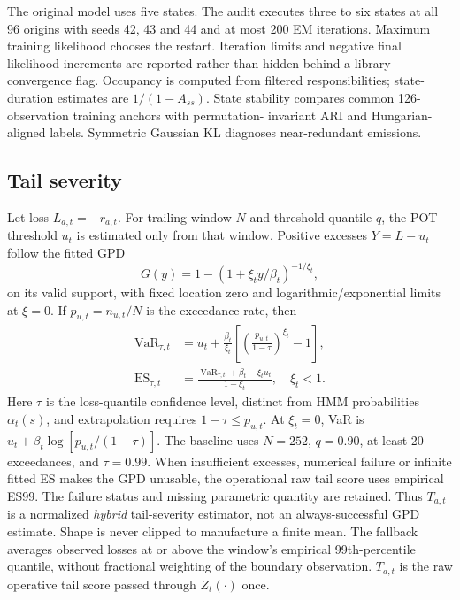 \documentclass[11pt]{article}
\begin{document}
The original model uses five states. The audit executes three to six states at all 96 origins with
seeds 42, 43 and 44 and at most 200 EM iterations. Maximum training likelihood chooses the restart.
Iteration limits and negative final likelihood increments are reported rather than hidden behind a
library convergence flag. Occupancy is computed from filtered responsibilities; state-duration estimates
are $1/(1-A_{ss})$. State stability compares common 126-observation training anchors with permutation-
invariant ARI and Hungarian-aligned labels. Symmetric Gaussian KL diagnoses near-redundant emissions.

\subsection{Tail severity}
Let loss $L_{a,t}=-r_{a,t}$. For trailing window $N$ and threshold quantile $q$, the POT threshold
$u_t$ is estimated only from that window. Positive excesses $Y=L-u_t$ follow the fitted GPD
\begin{equation}
G(y)=1-\left(1+\xi_t y/\beta_t\right)^{-1/\xi_t},
\end{equation}
on its valid support, with fixed location zero and logarithmic/exponential limits at $\xi=0$.
If $p_{u,t}=n_{u,t}/N$ is the exceedance rate, then
\begin{align}
\operatorname{VaR}_{\tau,t}
 &=u_t+\frac{\beta_t}{\xi_t}
 \left[\left(\frac{p_{u,t}}{1-\tau}\right)^{\xi_t}-1\right],\\
\operatorname{ES}_{\tau,t}
 &=\frac{\operatorname{VaR}_{\tau,t}+\beta_t-\xi_tu_t}{1-\xi_t},\quad \xi_t<1.
\end{align}
Here $\tau$ is the loss-quantile confidence level, distinct from HMM probabilities $\alpha_t(s)$,
and extrapolation requires $1-\tau\leq p_{u,t}$. At $\xi_t=0$, VaR is
$u_t+\beta_t\log[p_{u,t}/(1-\tau)]$. The baseline uses $N=252$, $q=0.90$,
at least 20 exceedances, and $\tau=0.99$.
When insufficient excesses, numerical failure or infinite fitted ES makes the GPD unusable,
the operational raw tail score uses empirical ES99. The failure status and missing parametric
quantity are retained. Thus $T_{a,t}$ is a normalized \emph{hybrid} tail-severity estimator,
not an always-successful GPD estimate. Shape is never clipped to manufacture a finite mean.
The fallback averages observed losses at or above the window's empirical 99th-percentile
quantile, without fractional weighting of the boundary observation. $T_{a,t}$ is the raw
operative tail score passed through $Z_t(\cdot)$ once.
\end{document}
